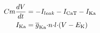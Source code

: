 \documentclass[12pt]{jarticle}
\begin{document}



\begin{align*}
   Cm\frac{dV}{dt} &= - I_{leak} - I_{{\rm CaT}} - I_{{\rm Ka}} \\
   I_{{\rm Ka}} &= \overline{g}_{\rm Ka}{\cdot}n{\cdot}l{\cdot}(V - E_{{\rm K}})
\end{align*}






\end{document}
